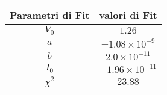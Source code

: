\begin{tabular}{cc}
\hline
	Parametri di Fit & valori di Fit\\ 
\hline
	$V_0$ & $1.26$ \\
	$a$ & $-1.08\times 10^{-9}$ \\
	$b$ & $2.0\times 10^{-11}$ \\
	$I_0$ & $-1.96\times 10^{-11}$ \\
	$\chi^2$ & $23.88$ \\
\hline
\end{tabular}
